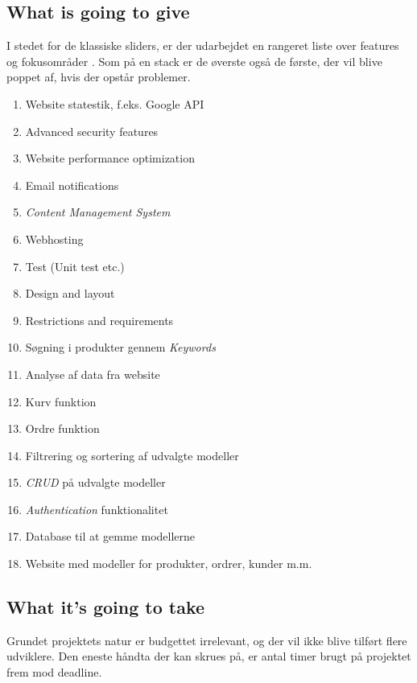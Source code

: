 \subsection{What is going to give}
I stedet for de klassiske sliders, er der udarbejdet en rangeret liste over features og fokusområder . 
Som på en stack er de øverste også de første, der vil blive poppet af, hvis der opstår problemer.
\begin{enumerate}[noitemsep]
    \item Website statestik, f.eks. Google API
    \item Advanced security features
    \item Website performance optimization
    \item Email notifications
    \item \emph{Content Management System}
    \item Webhosting
    \item Test (Unit test etc.)
    \item Design and layout
    \item Restrictions and requirements
    \item Søgning i produkter gennem \emph{Keywords}
    \item Analyse af data fra website
    \item Kurv funktion
    \item Ordre funktion
    \item Filtrering og sortering af udvalgte modeller
    \item \emph{CRUD} på udvalgte modeller
    \item \emph{Authentication} funktionalitet
    \item Database til at gemme modellerne
    \item Website med modeller for produkter, ordrer, kunder m.m.
    \label{list:what-is-going-to-give}
\end{enumerate}

\subsection{What it's going to take}
Grundet projektets natur er budgettet irrelevant, og der vil ikke blive tilført flere udviklere.
Den eneste håndta der kan skrues på, er antal timer brugt på projektet frem mod deadline.